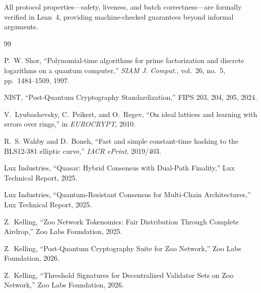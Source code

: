 \documentclass[11pt,letterpaper]{article}
\theoremstyle{definition}
\theoremstyle{remark}
\begin{document}
All protocol properties---safety, liveness, and batch correctness---are formally verified in Lean~4, providing machine-checked guarantees beyond informal arguments.

\begin{thebibliography}{99}

P.~W. Shor, ``Polynomial-time algorithms for prime factorization and discrete logarithms on a quantum computer,'' \textit{SIAM J. Comput.}, vol.~26, no.~5, pp.~1484--1509, 1997.

NIST, ``Post-Quantum Cryptography Standardization,'' FIPS 203, 204, 205, 2024.

V.~Lyubashevsky, C.~Peikert, and O.~Regev, ``On ideal lattices and learning with errors over rings,'' in \textit{EUROCRYPT}, 2010.

R.~S. Wahby and D.~Boneh, ``Fast and simple constant-time hashing to the BLS12-381 elliptic curve,'' \textit{IACR ePrint}, 2019/403.

Lux Industries, ``Quasar: Hybrid Consensus with Dual-Path Finality,'' Lux Technical Report, 2025.

Lux Industries, ``Quantum-Resistant Consensus for Multi-Chain Architectures,'' Lux Technical Report, 2025.

Z.~Kelling, ``Zoo Network Tokenomics: Fair Distribution Through Complete Airdrop,'' Zoo Labs Foundation, 2025.

Z.~Kelling, ``Post-Quantum Cryptography Suite for Zoo Network,'' Zoo Labs Foundation, 2026.

Z.~Kelling, ``Threshold Signatures for Decentralized Validator Sets on Zoo Network,'' Zoo Labs Foundation, 2026.

\end{thebibliography}
\end{document}

